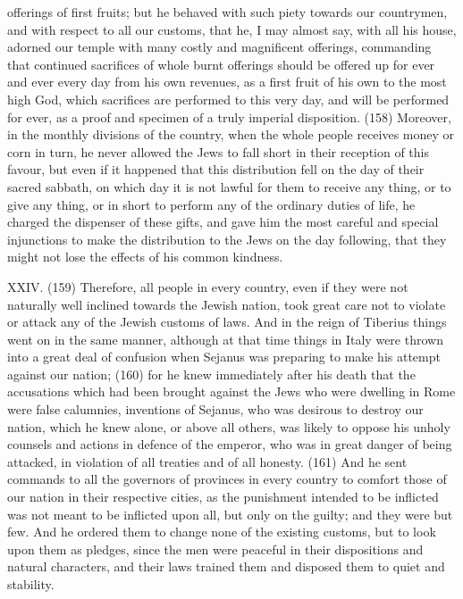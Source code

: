 offerings of first fruits; but he behaved with such piety towards our countrymen, and with respect to
all our customs, that he, I may almost say, with all his house, adorned our temple with many costly
and magnificent offerings, commanding that continued sacrifices of whole burnt offerings should
be offered up for ever and ever every day from his own revenues, as a first fruit of his own to the
most high God, which sacrifices are performed to this very day, and will be performed for ever, as
a proof and specimen of a truly imperial disposition. (158) Moreover, in the monthly divisions of the
country, when the whole people receives money or corn in turn, he never allowed the Jews to fall
short in their reception of this favour, but even if it happened that this distribution fell on the day of
their sacred sabbath, on which day it is not lawful for them to receive any thing, or to give any thing,
or in short to perform any of the ordinary duties of life, he charged the dispenser of these gifts, and
gave him the most careful and special injunctions to make the distribution to the Jews on the day
following, that they might not lose the effects of his common kindness.

XXIV. (159) Therefore, all people in every country, even if they were not naturally well inclined
towards the Jewish nation, took great care not to violate or attack any of the Jewish customs of
laws. And in the reign of Tiberius things went on in the same manner, although at that time things in
Italy were thrown into a great deal of confusion when Sejanus was preparing to make his attempt
against our nation; (160) for he knew immediately after his death that the accusations which had
been brought against the Jews who were dwelling in Rome were false calumnies, inventions of
Sejanus, who was desirous to destroy our nation, which he knew alone, or above all others, was
likely to oppose his unholy counsels and actions in defence of the emperor, who was in great
danger of being attacked, in violation of all treaties and of all honesty. (161) And he sent
commands to all the governors of provinces in every country to comfort those of our nation in their
respective cities, as the punishment intended to be inflicted was not meant to be inflicted upon all,
but only on the guilty; and they were but few. And he ordered them to change none of the existing
customs, but to look upon them as pledges, since the men were peaceful in their dispositions and
natural characters, and their laws trained them and disposed them to quiet and stability.

